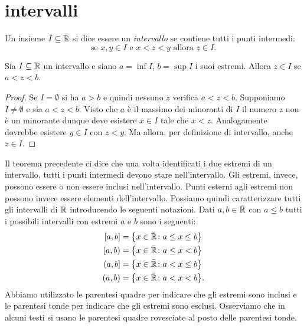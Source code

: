 \section{intervalli}

\begin{definition}[intervallo]
\label{def:intervallo}%
%
Un insieme $I\subseteq \bar{{\mathbb R}}$ si dice essere un \emph{intervallo}
se contiene tutti i punti intermedi:
\[
  \text{se $x, y \in I$ e $x<z<y$ allora $z \in I$.}
\]
\end{definition}
%
\begin{theorem}
Sia $I\subseteq {\mathbb R}$ un intervallo e siano $a=\inf I$, $b=\sup I$
i suoi estremi. Allora
$z\in I$ se $a < z < b$.
\end{theorem}
%
\begin{proof}
Se $I=\emptyset$ si ha $a>b$ e quindi nessuno $z$ verifica $a<z<b$.
Supponiamo $I\neq \emptyset$ e
sia $a < z < b$.
Visto che $a$ è il massimo dei minoranti di $I$
il numero $z$ non è un minorante dunque
deve esistere $x \in I$ tale
che $x < z$. Analogamente dovrebbe esistere $y\in I$
con $z<y$.
Ma allora, per definizione di intervallo, anche $z\in I$.
\end{proof}

Il teorema precedente ci dice che una volta identificati i due estremi
di un intervallo, tutti i punti intermedi devono stare nell'intervallo.
Gli estremi, invece, possono essere o non essere inclusi nell'intervallo.
Punti esterni agli estremi non possono invece essere elementi dell'intervallo.
Possiamo quindi caratterizzare tutti gli intervalli di ${\mathbb R}$
introducendo le seguenti notazioni. Dati $a,b\in \bar {{\mathbb R}}$ con $a\le b$
tutti i possibili intervalli con estremi $a$ e $b$ sono i seguenti:
\begin{equation}\label{eq:499494}
\begin{aligned}
\left[a,b\right] &= {\left\{ x\in \bar {{\mathbb R}}\colon a \le x \le b \right\}} \\
\left[a,b\right) &= {\left\{ x\in \bar {{\mathbb R}}\colon a \le x < b \right\}} \\
\left(a,b\right] &= {\left\{ x\in \bar {{\mathbb R}}\colon a < x \le b \right\}}\\
\left(a,b\right) &= {\left\{ x\in \bar {{\mathbb R}}\colon a < x < b \right\}}.
\end{aligned}
\end{equation}
Abbiamo utilizzato le parentesi quadre per indicare che gli estremi
sono inclusi e le parentesi tonde per indicare che gli estremi sono esclusi.
Osserviamo che in alcuni testi si usano le parentesi quadre rovesciate al posto
delle parentesi tonde.

